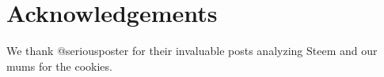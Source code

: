 \section{Acknowledgements}
  We thank @seriousposter for their invaluable posts analyzing Steem and our
  mums for the cookies.
